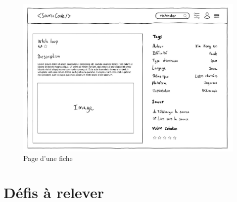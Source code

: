 \begin{figure}[H]
    \includegraphics[width=\textwidth,height=0.4\textheight,keepaspectratio]{images/resource.JPG}
    \centering
    \caption{Page d'une \gls{fiche}}
\end{figure}

\pagebreak
\section{Défis à relever}
\label{section:challengesToDefeat}

